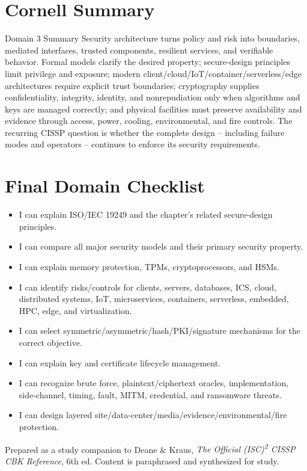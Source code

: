 \documentclass[10pt,letterpaper]{article}
\begin{document}
\section{Cornell Summary}
\begin{summarybox}{Domain 3 Summary}
Security architecture turns policy and risk into boundaries, mediated interfaces, trusted components, resilient services, and verifiable behavior. Formal models clarify the desired property; secure-design principles limit privilege and exposure; modern client/cloud/IoT/container/serverless/edge architectures require explicit trust boundaries; cryptography supplies confidentiality, integrity, identity, and nonrepudiation only when algorithms and keys are managed correctly; and physical facilities must preserve availability and evidence through access, power, cooling, environmental, and fire controls. The recurring CISSP question is whether the complete design -- including failure modes and operators -- continues to enforce its security requirements.
\end{summarybox}

\section{Final Domain Checklist}
\begin{itemize}[label=\(\square\)]
\item I can explain ISO/IEC 19249 and the chapter's related secure-design principles.
\item I can compare all major security models and their primary security property.
\item I can explain memory protection, TPMs, cryptoprocessors, and HSMs.
\item I can identify risks/controls for clients, servers, databases, ICS, cloud, distributed systems, IoT, microservices, containers, serverless, embedded, HPC, edge, and virtualization.
\item I can select symmetric/asymmetric/hash/PKI/signature mechanisms for the correct objective.
\item I can explain key and certificate lifecycle management.
\item I can recognize brute force, plaintext/ciphertext oracles, implementation, side-channel, timing, fault, MITM, credential, and ransomware threats.
\item I can design layered site/data-center/media/evidence/environmental/fire protection.
\end{itemize}
\vfill
{\footnotesize\color{Teal}Prepared as a study companion to Deane \& Kraus, \textit{The Official (ISC)\textsuperscript{2} CISSP CBK Reference}, 6th ed. Content is paraphrased and synthesized for study.}
\end{document}
